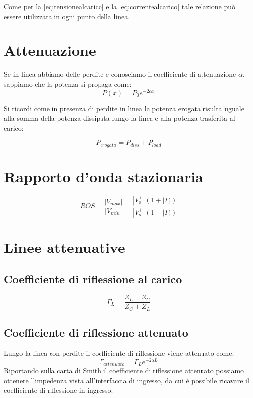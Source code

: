 \documentclass[10pt,a4paper]{report}
\begin{document}
			Come per la \ref{eq:tensionealcarico} e la \ref{eq:correntealcarico} tale relazione può essere utilizzata in ogni punto della linea.


	\section{Attenuazione}

		Se in linea abbiamo delle perdite e conosciamo il coefficiente di attenuazione $\alpha$, sappiamo che la potenza si propaga come:
		\begin{equation}
		P(x)=P_0e^{-2 \alpha x}
		\end{equation}

		Si ricordi come in presenza di perdite in linea la potenza erogata risulta uguale alla somma della potenza dissipata lungo la linea e alla potenza trasferita al carico:

		\begin{equation}
		P_{erogata}=P_{diss}+P_{load}
		\end{equation}

	\section{Rapporto d'onda stazionaria}

	\begin{equation}
	ROS=\frac{|V_{max}|}{|V_{min}|}=\frac{|V_o^+|(1+|\Gamma|)}{|V_o^+|(1-|\Gamma|)}
	\end{equation}

	\section{Linee attenuative}

		\subsection{Coefficiente di riflessione al carico}

		\begin{equation}
		\Gamma_L=\frac{Z_L-Z_C}{Z_C+Z_L}
		\end{equation}



		\subsection{Coefficiente di riflessione attenuato}
		Lungo la linea con perdite il coefficiente di riflessione viene attenuato come:
		\begin{equation}
		\Gamma_{attenuato}=\Gamma_L e^{-2\alpha L}
		\end{equation}
		Riportando sulla carta di Smith il coefficiente di riflessione attenuato possiamo ottenere l'impedenza vista all'interfaccia di ingresso, da cui è possibile ricavare il coefficiente di riflessione in ingresso:
\end{document}
